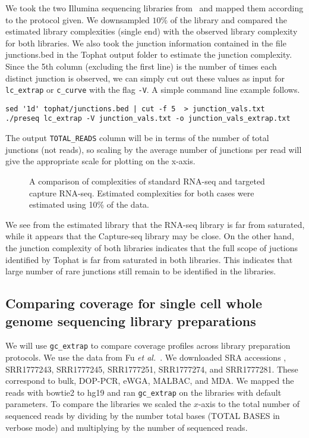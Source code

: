 \documentclass[11pt, titlepage]{article}
\newcommand{\fn}[1]{\texttt{#1}}
\begin{document}
We took the two Illumina sequencing libraries from~\cite{mercer2011targeted} and
mapped them according to the protocol given.  We downsampled $10 \%$ of the library
and compared the estimated library complexities (single end) with the observed library
complexity for both libraries.  We also took the junction information contained in the file
junctions.bed in the Tophat output folder to estimate the junction complexity.  Since
the 5th column (excluding the first line) is the number of times each
distinct junction is observed, we can simply cut out these values as input for
\fn{lc\_extrap} or \fn{c\_curve} with the flag \fn{-V}.  A simple command line example follows.

\begin{verbatim}
sed '1d' tophat/junctions.bed | cut -f 5  > junction_vals.txt
./preseq lc_extrap -V junction_vals.txt -o junction_vals_extrap.txt
\end{verbatim}

The output \fn{TOTAL\_READS} column will be in terms of the number of
total junctions (not reads), so scaling by the average number of junctions per
read will give the appropriate scale for plotting on the x-axis.

\begin{figure}[h!]
\caption{A comparison of complexities of standard RNA-seq and
targeted capture RNA-seq.  Estimated complexities for both cases were
estimated using 10\% of the data.}
\end{figure}

We see from the estimated library that the RNA-seq library is far
from saturated, while it appears that the Capture-seq library
may be close.  On the other hand, the junction complexity of
both libraries indicates that the full scope of juctions identified
by Tophat is far from saturated in both libraries.  This indicates
that large number of rare junctions still remain to be identified
in the libraries.


\newpage

\subsection*{Comparing coverage for single cell whole genome sequencing library preparations}

We will use \fn{gc\_extrap} to compare coverage profiles
across library preparation protocols.  We use the data
from Fu {\em et al.}~\cite{fu2015uniform}.
We downloaded SRA accessions ,
SRR1777243, SRR1777245, SRR1777251,
SRR1777274, and SRR1777281.
These correspond to bulk, DOP-PCR,
eWGA, MALBAC, and MDA.
We mapped the reads with bowtie2 to hg19
and ran \fn{gc\_extrap} on the libraries with default
parameters.  To compare the libraries we scaled
the $x$-axis to the total number of sequenced
reads by dividing by the number total bases
(TOTAL BASES in verbose mode) and multiplying
by the number of sequenced reads.
\end{document}
